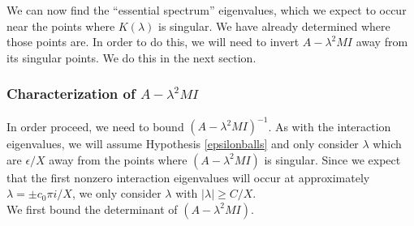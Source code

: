 \documentclass[12pt]{article}
\begin{document}
We can now find the ``essential spectrum'' eigenvalues, which we expect to occur near the points where $K(\lambda)$ is singular. We have already determined where those points are. In order to do this, we will need to invert $A - \lambda^2 MI$ away from its singular points. We do this in the next section.

\subsubsection{Characterization of \texorpdfstring{$A - \lambda^2 MI$}{Matrix A} }

In order proceed, we need to bound $(A - \lambda^2 MI)^{-1}$. As with the interaction eigenvalues, we will assume Hypothesis \ref{epsilonballs} and only consider $\lambda$ which are $\epsilon/X$ away from the points where $(A - \lambda^2 MI)$ is singular. Since we expect that the first nonzero interaction eigenvalues will occur at approximately $\lambda = \pm c_0 \pi i / X$, we only consider $\lambda$ with $|\lambda| \geq C/X$.\\

We first bound the determinant of $(A - \lambda^2 MI)$. 

\end{document}
